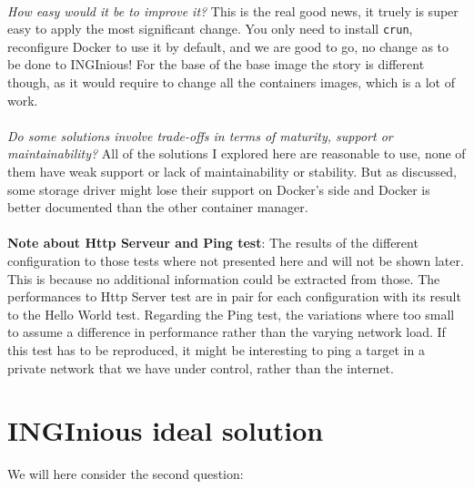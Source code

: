 \paragraph{}\textit{How easy would it be to improve it?}  This is the real good news, it truely is super easy to apply the most significant change.  You only need to install \texttt{crun}, reconfigure Docker to use it by default, and we are good to go, no change as to be done to INGInious!  For the base of the base image the story is different though, as it would require to change all the containers images, which is a lot of work.
\paragraph{}\textit{Do some solutions involve trade-offs in terms of maturity, support or maintainability?}  All of the solutions I explored here are reasonable to use, none of them have weak support or lack of maintainability or stability.  But as discussed, some storage driver might lose their support on Docker's side and Docker is better documented than the other container manager.

\paragraph{}\textbf{Note about Http Serveur and Ping test}:  The results of the different configuration to those tests where not presented here and will not be shown later.  This is because no additional information could be extracted from those.  The performances to Http Server test are in pair for each configuration with its result to the Hello World test.  Regarding the Ping test, the variations where too small to assume a difference in performance rather than the varying network load.  If this test has to be reproduced, it might be interesting to ping a target in a private network that we have under control, rather than the internet. %

\section{INGInious ideal solution}
We will here consider the second question:
\begin{center}
\end{center}


